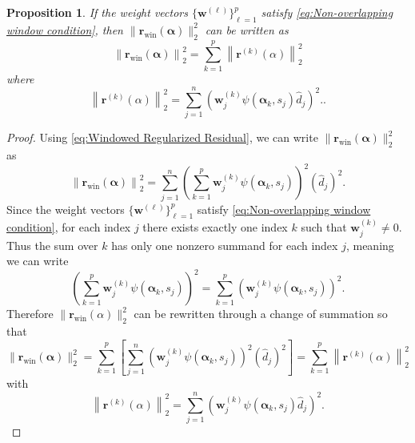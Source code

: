 \documentclass[12pt]{article}
\newcommand{\rVec}{\mathbf{r}}	%
\newcommand{\wVec}{\mathbf{w}}	%
\newcommand{\dft}[1]{\widehat{#1}}	%
\newcommand{\regparam}{\alpha}  %
\newcommand{\regparamVec}{\bm{\regparam}}   %
\newcommand{\mfilt}{\psi}
\newcommand{\singular}{s}	%
\newtheorem{proposition}{Proposition}[section]
\begin{document}
\begin{proposition}
\label{prop:Non-overlapping windows}
If the weight vectors $\{\wVec^{(\ell)}\}_{\ell=1}^{p}$ satisfy \eqref{eq:Non-overlapping window condition}, then $\|\rVec_{\text{win}}(\regparamVec)\|_2^2$ can be written as
\[\left\|\rVec_{\text{win}}(\regparamVec)\right\|_2^2 = \sum_{k=1}^{p} \left\|\rVec^{(k)}(\regparam)\right\|_2^2\]
where
\[\left\|\rVec^{(k)}(\regparam)\right\|_2^2 = \sum_{j=1}^{n} \left( \wVec_j^{(k)} \mfilt\left(\regparamVec_{k},\singular_j\right)\dft{d}_j\right)^2..\]
\end{proposition}
\begin{proof}
Using \eqref{eq:Windowed Regularized Residual}, we can write $\|\rVec_{\text{win}}(\regparamVec)\|_2^2$ as
\[\left\|\rVec_{\text{win}}(\regparamVec)\right\|_2^2 = \sum_{j=1}^{n} \left(\sum_{k=1}^{p} \wVec_j^{(k)} \mfilt\left(\regparamVec_{k},\singular_j\right) \right)^2 \left(\dft{d}_j\right)^2.\]
Since the weight vectors $\{\wVec^{(\ell)}\}_{\ell=1}^{p}$ satisfy \eqref{eq:Non-overlapping window condition}, for each index $j$ there exists exactly one index $k$ such that $\wVec^{(k)}_j \neq 0$. Thus the sum over $k$ has only one nonzero summand for each index $j$, meaning we can write
\[\left(\sum_{k=1}^{p} \wVec_j^{(k)} \mfilt\left(\regparamVec_{k},\singular_j\right) \right)^2 = \sum_{k=1}^{p} \left( \wVec_j^{(k)} \mfilt\left(\regparamVec_{k},\singular_j\right)\right)^2.\]
Therefore $\|\rVec_{\text{win}}(\regparam)\|_2^2$ can be rewritten through a change of summation so that
\[\|\rVec_{\text{win}}(\regparamVec)\|_2^2 = \sum_{k=1}^{p} \left[ \sum_{j=1}^{n} \left( \wVec_j^{(k)} \mfilt\left(\regparamVec_{k},\singular_j\right) \right)^2 \left(\dft{d}_j\right)^2\right] = \sum_{k=1}^{p} \left\|\rVec^{(k)}(\regparam)\right\|_2^2\]
with
\[\left\|\rVec^{(k)}(\regparam)\right\|_2^2 = \sum_{j=1}^{n} \left( \wVec_j^{(k)} \mfilt\left(\regparamVec_{k},\singular_j\right)\dft{d}_j\right)^2.\]
\end{proof}
\end{document}
